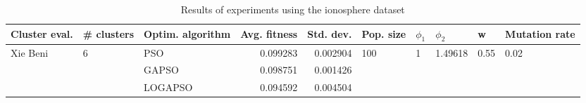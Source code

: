 \begin{table}
\centering
\caption{Results of experiments using the ionosphere dataset}
\begin{tabular}{lllrrlllll}
\toprule
            Cluster eval. &        \# clusters & Optim. algorithm &  Avg. fitness &  Std. dev. &            Pop. size &         $\phi_{1}$ &               $\phi_{2}$ &                     w &         Mutation rate \\
\midrule
\multirow{3}{*}{Xie Beni} & \multirow{3}{*}{6} &              PSO &      0.099283 &   0.002904 & \multirow{3}{*}{100} & \multirow{3}{*}{1} & \multirow{3}{*}{1.49618} & \multirow{3}{*}{0.55} & \multirow{3}{*}{0.02} \\
                          &                    &            GAPSO &      0.098751 &   0.001426 &                      &                    &                          &                       &                       \\
                          &                    &          LOGAPSO &      0.094592 &   0.004504 &                      &                    &                          &                       &                       \\
\bottomrule
\end{tabular}
\end{table}

